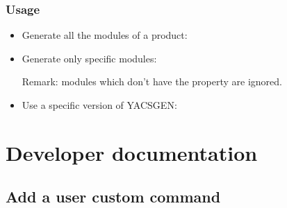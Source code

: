 \documentclass[a4paper,10pt,english]{sphinxmanual}
\begin{document}
\subsection{Usage}
\label{\detokenize{commands/generate:usage}}\begin{itemize}
\item {} 
Generate all the modules of a product:

%
\begin{sphinxVerbatim}[commandchars=\\\{\}]
  
\end{sphinxVerbatim}

\item {} 
Generate only specific modules:

%
\begin{sphinxVerbatim}[commandchars=\\\{\}]
    
\end{sphinxVerbatim}

Remark: modules which don’t have the  property are ignored.

\item {} 
Use a specific version of YACSGEN:

%
\begin{sphinxVerbatim}[commandchars=\\\{\}]
    
\end{sphinxVerbatim}

\end{itemize}


\chapter{Developer documentation}
\label{\detokenize{index:developer-documentation}}
\clearpage


\section{Add a user custom command}
\label{\detokenize{write_command:svn}}\label{\detokenize{write_command:add-a-user-custom-command}}\label{\detokenize{write_command::doc}}
\end{document}
